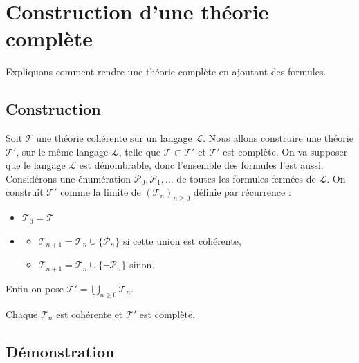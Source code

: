 \documentclass[11pt,class=report,crop=false]{standalone}
\begin{document}
\section{Construction d'une théorie complète}
\label{sec:complete}

Expliquons comment rendre une théorie complète en ajoutant des formules.

\subsection{Construction}

Soit $\mathcal{T}$ une théorie cohérente sur un langage $\mathcal{L}$. Nous allons construire une théorie $\mathcal{T}'$, sur le même langage $\mathcal{L}$, telle que $\mathcal{T} \subset \mathcal{T}'$ et $\mathcal{T}'$ est complète.
On va supposer que le langage $\mathcal{L}$ est dénombrable, donc l'ensemble des formules l'est aussi. Considérons une énumération $\mathcal{P}_0, \mathcal{P}_1, \ldots$ de toutes les formules fermées de $\mathcal{L}$.
On construit $\mathcal{T}'$ comme la limite de $(\mathcal{T}_n)_{n\ge0}$ définie par récurrence :
\begin{itemize}
	\item $\mathcal{T}_0 = \mathcal{T}$
	\item 
	\begin{itemize}
		\item $\mathcal{T}_{n+1} = \mathcal{T}_n \cup \{\mathcal{P}_n\}$ si cette union est cohérente,
		\item $\mathcal{T}_{n+1} = \mathcal{T}_n \cup \{\lnot \mathcal{P}_n\}$ sinon.
	\end{itemize}
\end{itemize}
Enfin on pose $\mathcal{T}' = \bigcup_{n \ge 0} \mathcal{T}_n$.

\begin{proposition}
	Chaque $\mathcal{T}_n$ est cohérente et $\mathcal{T}'$ est complète.
\end{proposition}

\subsection{Démonstration}
\end{document}
